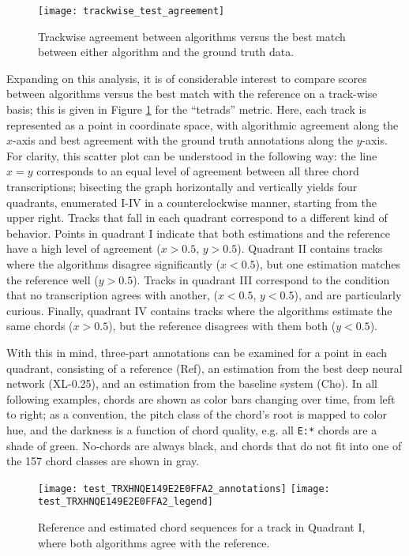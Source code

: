 \begin{figure}[t!]
\centering
\texttt{[image: trackwise\_test\_agreement]}
\caption{Trackwise agreement between algorithms versus the best match between either algorithm and the ground truth data.}
\label{fig:trackwise_test_agreement}
\end{figure}


Expanding on this analysis, it is of considerable interest to compare scores between algorithms versus the best match with the reference on a track-wise basis; this is given in Figure \ref{fig:trackwise_test_agreement} for the ``tetrads'' metric.
Here, each track is represented as a point in coordinate space, with algorithmic agreement along the $x$-axis and best agreement with the ground truth annotations along the $y$-axis.
For clarity, this scatter plot can be understood in the following way:
the line $x=y$ corresponds to an equal level of agreement between all three chord transcriptions;
bisecting the graph horizontally and vertically yields four quadrants, enumerated I-IV in a counterclockwise manner, starting from the upper right.
Tracks that fall in each quadrant correspond to a different kind of behavior.
Points in quadrant I indicate that both estimations and the reference have a high level of agreement ($x > 0.5$, $y > 0.5$).
Quadrant II contains tracks where the algorithms disagree significantly ($x < 0.5$), but one estimation matches the reference well ($y > 0.5$).
Tracks in quadrant III correspond to the condition that no transcription agrees with another, ($x < 0.5$, $y < 0.5$), and are particularly curious.
Finally, quadrant IV contains tracks where the algorithms estimate the same chords ($x > 0.5$), but the reference disagrees with them both ($y < 0.5$).


With this in mind, three-part annotations can be examined for a point in each quadrant, consisting of a reference (Ref), an estimation from the best deep neural network (XL-0.25), and an estimation from the baseline system (Cho).
In all following examples, chords are shown as color bars changing over time, from left to right;
as a convention, the pitch class of the chord's root is mapped to color hue, and the darkness is a function of chord quality, e.g. all \texttt{E:*} chords are a shade of green.
No-chords are always black, and chords that do not fit into one of the 157 chord classes are shown in gray.

\begin{figure}[t!]
\centering
\texttt{[image: test\_TRXHNQE149E2E0FFA2\_annotations]}
\texttt{[image: test\_TRXHNQE149E2E0FFA2\_legend]}
\caption{Reference and estimated chord sequences for a track in Quadrant I, where both algorithms agree with the reference.}
\label{fig:test_quadI}
\end{figure}

